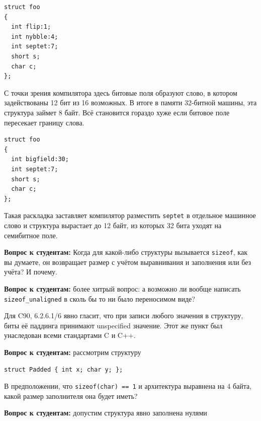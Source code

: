 \documentclass[a4paper,12pt,oneside]{article}
\newif\ifanswers
\begin{document}
\begin{lstlisting}
struct foo 
{
  int flip:1;
  int nybble:4;
  int septet:7;
  short s;
  char c;
};
\end{lstlisting}

С точки зрения компилятора здесь битовые поля образуют слово, в котором задействованы 12 бит из 16 возможных. В итоге в памяти 32-битной машины, эта структура займет 8 байт. Всё становится гораздо хуже если битовое поле пересекает границу слова.

\begin{lstlisting}
struct foo 
{
  int bigfield:30;
  int septet:7;
  short s;
  char c;
};
\end{lstlisting}

Такая раскладка заставляет компилятор разместить \lstinline!septet! в отдельное машинное слово и структура вырастает до 12 байт, из которых 32 бита уходят на семибитное поле.

\textbf{Вопрос к студентам:} Когда для какой-либо структуры вызывается \lstinline!sizeof!, как вы думаете, он возвращает размер с учётом выравнивания и заполнения или без учёта? И почему.

\ifanswers
Правильный ответ: с учётом. Потому что иначе например не работала бы идиома \lstinline!malloc (sizeof(widget))! -- здесь выделялось бы динамической памяти меньше, чем реально нужно.
\fi

\textbf{Вопрос к студентам:} более хитрый вопрос: а возможно ли вообще написать \lstinline!sizeof_unaligned! в сколь бы то ни было переносимом виде?

\ifanswers
Правильный ответ автору неизвестен. Скорее всего нет, но никто не исключает наличие какого-нибудь особо хитрого трюка.
\fi

Для C90, 6.2.6.1/6 явно гласит, что при записи любого значения в структуру, биты её паддинга принимают unspecified значение. Этот же пункт был унаследован всеми стандартами C и C++.

\textbf{Вопрос к студентам:} рассмотрим структуру

\begin{lstlisting}
struct Padded { int x; char y; };
\end{lstlisting}

В предположении, что \lstinline!sizeof(char) == 1! и архитектура выравнена на 4 байта, какой размер заполнителя она будет иметь?

\ifanswers
Правильный ответ: 3 байта.
\fi

\textbf{Вопрос к студентам:} допустим структура явно заполнена нулями
\end{document}
